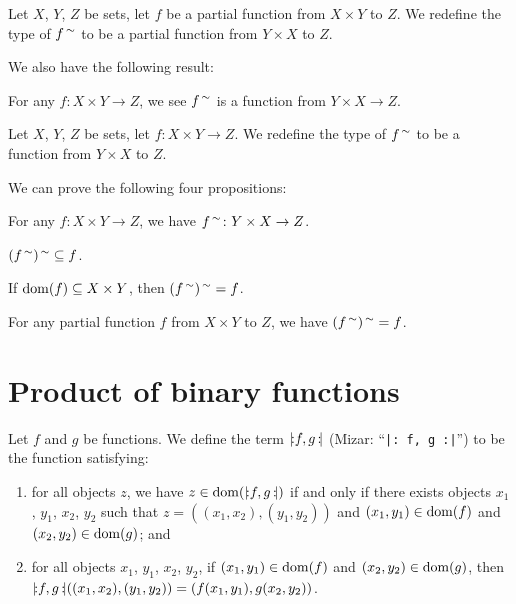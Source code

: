 \documentclass{article}
\begin{document}
\begin{definition}
Let $X$, $Y$, $Z$ be sets, let $f$ be a partial function from $X\times Y$
to $Z$.
We redefine the type of $f^{\,\sim}$ to be a partial function from
$Y\times X$ to $Z$.
\end{definition}

We also have the following result:
\begin{thm}
\item\label{funct4:49} For any $f\colon X\times Y\to Z$,
  we see $f^{\,\sim}$ is a function from $Y\times X\to Z$.
\end{thm}

\begin{definition}
Let $X$, $Y$, $Z$ be sets, let $f\colon X\times Y\to Z$.
We redefine the type of $f^{\,\sim}$ to be a function from
$Y\times X$ to $Z$.
\end{definition}

We can prove the following four propositions:
\begin{thm}
\item\label{funct4:50} For any $f\colon X\times Y\to Z$, we have
  $f^{\,\sim}\colon Y\times X\to Z$.
\item\label{funct4:51} $(f^{\,\sim})^{\,\sim}\subseteq f$.
\item\label{funct4:52} If $\operatorname{dom}(f)\subseteq X\times Y$, then $(f^{\,\sim})^{\,\sim}=f$.
\item\label{funct4:53} For any partial function $f$ from $X\times Y$
  to $Z$, we have $(f^{\,\sim})^{\,\sim}=f$.
\end{thm}

\section{Product of binary functions}

\begin{definition}
Let $f$ and $g$ be functions.
We define the term $\mathopen{{|}\!{:}}f,g\,\mathclose{{:}\!{|}}$ (Mizar: ``\verb#|: f, g :|#'') to be the function satisfying:
\begin{defn}
\item \begin{enumerate}[label=(\roman*)]
\item for all objects $z$, we have $z\in\operatorname{dom}(\mathopen{{|}\!{:}}f,g\,\mathclose{{:}\!{|}})$ if and only if
  there exists objects $x_{1}$, $y_{1}$, $x_{2}$, $y_{2}$ such that $z=((x_{1},x_{2}),(y_{1},y_{2}))$
  and $(x_{1},y_{1})\in\operatorname{dom}(f)$ and $(x_{2},y_{2})\in\operatorname{dom}(g)$; and
\item for all objects $x_{1}$, $y_{1}$, $x_{2}$, $y_{2}$,
  if $(x_{1},y_{1})\in\operatorname{dom}(f)$ and $(x_{2},y_{2})\in\operatorname{dom}(g)$,
  then $\mathopen{{|}\!{:}}f,g\,\mathclose{{:}\!{|}}((x_{1},x_{2}),(y_{1},y_{2}))=(f(x_{1},y_{1}), g(x_{2},y_{2}))$.
\end{enumerate}
\end{defn}
\end{definition}
\end{document}
